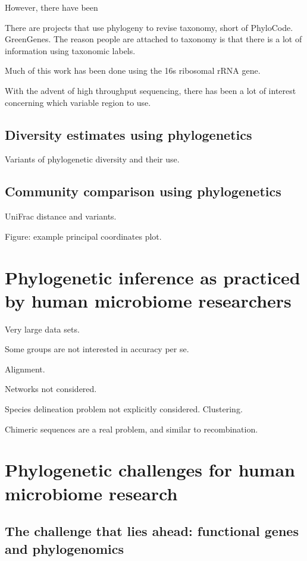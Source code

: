 \documentclass{amsart}
\begin{document}
However, there have been

There are projects that use phylogeny to revise taxonomy, short of PhyloCode.
GreenGenes.
The reason people are attached to taxonomy is that there is a lot of information using taxonomic labels.

Much of this work has been done using the 16s ribosomal rRNA gene.

With the advent of high throughput sequencing, there has been a lot of interest concerning which variable region to use.

\subsection{Diversity estimates using phylogenetics}

Variants of phylogenetic diversity and their use.

\subsection{Community comparison using phylogenetics}

UniFrac distance and variants.

Figure: example principal coordinates plot.



\section{Phylogenetic inference as practiced by human microbiome researchers}

Very large data sets.

Some groups are not interested in accuracy per se.

Alignment.

Networks not considered.

Species delineation problem not explicitly considered. Clustering.


Chimeric sequences are a real problem, and similar to recombination.


\section{Phylogenetic challenges for human microbiome research}

\subsection{The challenge that lies ahead: functional genes and phylogenomics}
\end{document}
